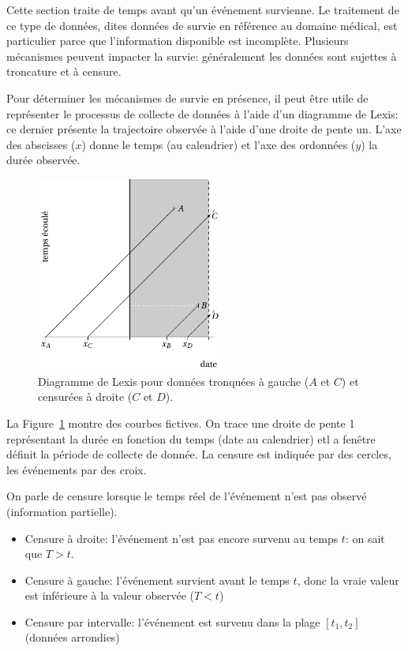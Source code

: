 \documentclass[
  11pt,
  letterpaper,
]{scrbook}
\providecommand{\tightlist}{%
  \setlength{\itemsep}{0pt}\setlength{\parskip}{0pt}}\usepackage{longtable,booktabs,array}
\theoremstyle{definition}
\theoremstyle{remark}
\begin{document}
Cette section traite de temps avant qu'un événement survienne. Le
traitement de ce type de données, dites données de survie en référence
au domaine médical, est particulier parce que l'information disponible
est incomplète. Plusieurs mécanismes peuvent impacter la survie:
généralement les données sont sujettes à troncature et à censure.

Pour déterminer les mécanismes de survie en présence, il peut être utile
de représenter le processus de collecte de données à l'aide d'un
diagramme de Lexis: ce dernier présente la trajectoire observée à l'aide
d'une droite de pente un. L'axe des abscisses (\(x\)) donne le temps (au
calendrier) et l'axe des ordonnées (\(y\)) la durée observée.

\begin{figure}[ht!]

{\centering \includegraphics[width=0.55\textwidth,height=\textheight]{figures/Lexis_censure.pdf}

}

\caption{\label{fig-lexis}Diagramme de Lexis pour données tronquées à
gauche (\(A\) et \(C\)) et censurées à droite (\(C\) et \(D\)).}

\end{figure}

La Figure~\ref{fig-lexis} montre des courbes fictives. On trace une
droite de pente 1 représentant la durée en fonction du temps (date au
calendrier) etl a fenêtre définit la période de collecte de donnée. La
censure est indiquée par des cercles, les événements par des croix.

On parle de censure lorsque le temps réel de l'événement n'est pas
observé (information partielle).

\begin{itemize}
\tightlist
\item
  Censure à droite: l'événement n'est pas encore survenu au temps \(t\):
  on sait que \(T > t\).
\item
  Censure à gauche: l'événement survient avant le temps \(t\), donc la
  vraie valeur est inférieure à la valeur observée (\(T < t\))
\item
  Censure par intervalle: l'événement est survenu dans la plage
  \([t_1, t_2]\) (données arrondies)
\end{itemize}
\end{document}
